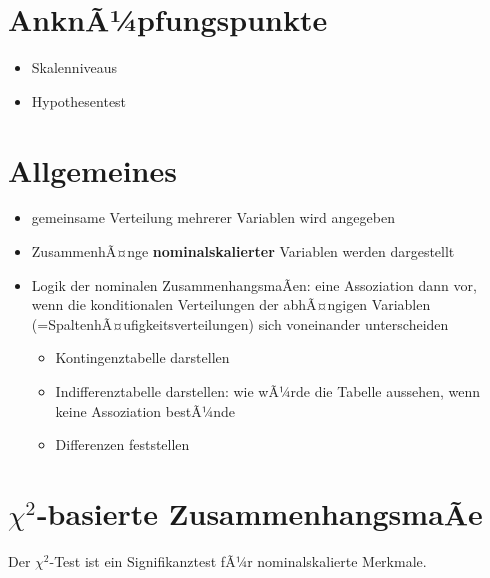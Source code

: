 \documentclass[
]{book}
\providecommand{\tightlist}{%
  \setlength{\itemsep}{0pt}\setlength{\parskip}{0pt}}
\begin{document}
\hypertarget{anknuxe3uxbcpfungspunkte}{%
\section{AnknÃ¼pfungspunkte}\label{anknuxe3uxbcpfungspunkte}}

\begin{itemize}
\tightlist
\item
  Skalenniveaus
\item
  Hypothesentest
\end{itemize}

\hypertarget{allgemeines-7}{%
\section{Allgemeines}\label{allgemeines-7}}

\begin{itemize}
\tightlist
\item
  gemeinsame Verteilung mehrerer Variablen wird angegeben
\item
  ZusammenhÃ¤nge \textbf{nominalskalierter} Variablen werden dargestellt
\item
  Logik der nominalen ZusammenhangsmaÃen: eine Assoziation dann vor, wenn die konditionalen Verteilungen der abhÃ¤ngigen Variablen (=SpaltenhÃ¤ufigkeitsverteilungen) sich voneinander unterscheiden

  \begin{itemize}
  \tightlist
  \item
    Kontingenztabelle darstellen
  \item
    Indifferenztabelle darstellen: wie wÃ¼rde die Tabelle aussehen, wenn keine Assoziation bestÃ¼nde
  \item
    Differenzen feststellen
  \end{itemize}
\end{itemize}

\hypertarget{chi2-basierte-zusammenhangsmauxe3e}{%
\section{\texorpdfstring{\(\chi^2\)-basierte ZusammenhangsmaÃe}{\textbackslash chi\^{}2-basierte ZusammenhangsmaÃe}}\label{chi2-basierte-zusammenhangsmauxe3e}}

Der \(\chi^2\)-Test ist ein Signifikanztest fÃ¼r nominalskalierte Merkmale.
\end{document}
